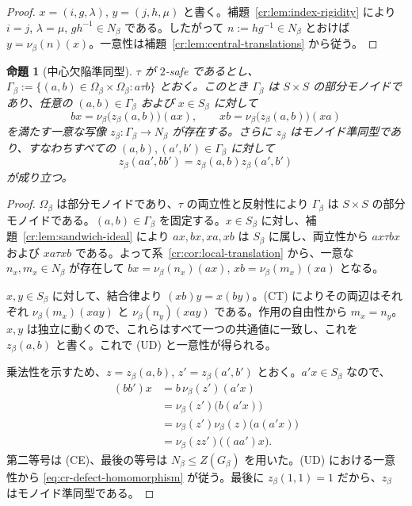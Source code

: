 \documentclass[10pt,a4paper]{ltjsarticle}
\newtheorem{proposition}[theorem]{命題}
\theoremstyle{definition}
\theoremstyle{remark}
\begin{document}
\begin{proof}
\(x=(i,g,\lambda)\), \(y=(j,h,\mu)\)
と書く。補題~\ref{cr:lem:index-rigidity} により $i=j$, $\lambda=\mu$, $gh^{-1}\in N_\beta$ である。したがって $n:=hg^{-1}\in N_\beta$ とおけば $y=\nu_\beta(n)(x)$。一意性は補題~\ref{cr:lem:central-translations} から従う。
\end{proof}

\begin{proposition}[中心欠陥準同型]
\label{cr:lem:uniform-defect}
$\tau$ が $2$-safe であるとし、
\(\Gamma_\beta:=\{(a,b)\in\Omega_\beta\times\Omega_\beta:a\tau b\}\)
とおく。このとき \(\Gamma_\beta\) は $S\times S$ の部分モノイドであり、任意の
\((a,b)\in\Gamma_\beta\) および $x\in S_\beta$ に対して
\[
bx=\nu_\beta\bigl(z_\beta(a,b)\bigr)(ax),
\qquad
xb=\nu_\beta\bigl(z_\beta(a,b)\bigr)(xa)
\tag{UD}
\]
を満たす一意な写像
\(z_\beta:\Gamma_\beta\to N_\beta\)
が存在する。さらに $z_\beta$ はモノイド準同型であり、すなわちすべての
$(a,b),(a',b')\in\Gamma_\beta$ に対して
\begin{equation}
z_\beta(aa',bb')=z_\beta(a,b)z_\beta(a',b')
\label{eq:cr-defect-homomorphism}
\end{equation}
が成り立つ。
\end{proposition}

\begin{proof}
\(\Omega_\beta\) は部分モノイドであり、$\tau$ の両立性と反射性により \(\Gamma_\beta\) は $S\times S$ の部分モノイドである。$(a,b)\in\Gamma_\beta$ を固定する。$x\in S_\beta$ に対し、補題~\ref{cr:lem:sandwich-ideal} により $ax,bx,xa,xb$ は $S_\beta$ に属し、両立性から $ax\tau bx$ および $xa\tau xb$ である。よって系~\ref{cr:cor:local-translation} から、一意な $n_x,m_x\in N_\beta$ が存在して
\(bx=\nu_\beta(n_x)(ax)\), \(xb=\nu_\beta(m_x)(xa)\)
となる。

$x,y\in S_\beta$ に対して、結合律より $(xb)y=x(by)$。\textup{(CT)} によりその両辺はそれぞれ
\(\nu_\beta(m_x)(xay)\) と \(\nu_\beta(n_y)(xay)\)
である。作用の自由性から $m_x=n_y$。$x,y$ は独立に動くので、これらはすべて一つの共通値に一致し、これを $z_\beta(a,b)$ と書く。これで \textup{(UD)} と一意性が得られる。

乗法性を示すため、$z=z_\beta(a,b)$, $z'=z_\beta(a',b')$ とおく。$a'x\in S_\beta$ なので、
\[
\begin{aligned}
(bb')x
&=b\,\nu_\beta(z')(a'x)\\
&=\nu_\beta(z')\bigl(b(a'x)\bigr)\\
&=\nu_\beta(z')\nu_\beta(z)\bigl(a(a'x)\bigr)\\
&=\nu_\beta(zz')\bigl((aa')x\bigr).
\end{aligned}
\]
第二等号は \textup{(CE)}、最後の等号は \(N_\beta\le Z(G_\beta)\) を用いた。\textup{(UD)} における一意性から \eqref{eq:cr-defect-homomorphism} が従う。最後に $z_\beta(1,1)=1$ だから、$z_\beta$ はモノイド準同型である。
\end{proof}
\end{document}
